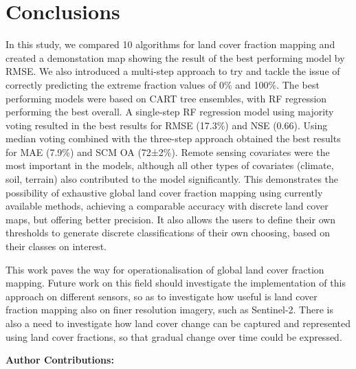 \documentclass[a4paper,10pt]{article}
\newcommand{\minisection}[1]{\medskip \textbf{#1:}}
\begin{document}
\section{Conclusions}


In this study, we compared 10 algorithms for land cover fraction mapping and created a demonstation map showing the result of the best performing model by \gls{RMSE}.
We also introduced a multi-step approach to try and tackle the issue of correctly predicting the extreme fraction values of 0\% and 100\%.
The best performing models were based on \gls{CART} tree ensembles, with \gls{RF} regression performing the best overall.
A single-step \gls{RF} regression model using majority voting resulted in the best results for RMSE (17.3\%) and \gls{NSE} (0.66).
Using median voting combined with the three-step approach obtained the best results for \gls{MAE} (7.9\%) and \gls{SCM} \gls{OA} (72±2\%).
Remote sensing covariates were the most important in the models, although all other types of covariates (climate, soil, terrain) also contributed to the model significantly.
This demonstrates the possibility of exhaustive global land cover fraction mapping using currently available methods, achieving a comparable accuracy with discrete land cover maps, but offering better precision.
It also allows the users to define their own thresholds to generate discrete classifications of their own choosing, based on their classes on interest.

This work paves the way for operationalisation of global land cover fraction mapping.
Future work on this field should investigate the implementation of this approach on different sensors, so as to investigate how useful is land cover fraction mapping also on finer resolution imagery, such as Sentinel-2.
There is also a need to investigate how land cover change can be captured and represented using land cover fractions, so that gradual change over time could be expressed.

\minisection{Author Contributions}
\end{document}
